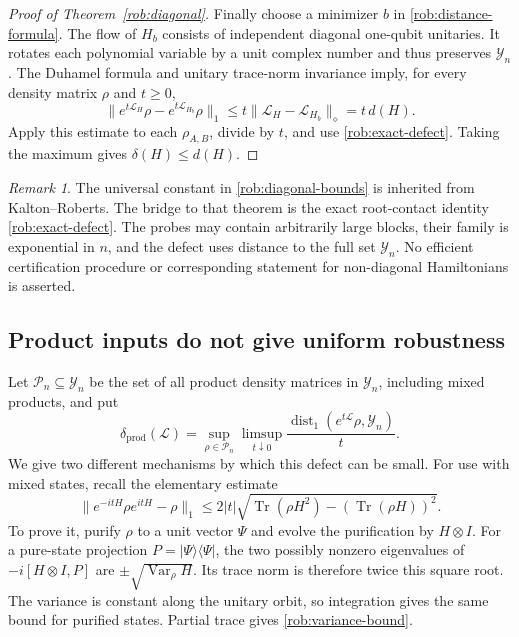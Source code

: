 \documentclass[reqno]{amsart}
\theoremstyle{definition}
\theoremstyle{remark}
\newtheorem{remark}[theorem]{Remark}
\DeclareMathOperator{\Tr}{Tr}
\begin{document}
\begin{proof}[Proof of Theorem~\ref{rob:diagonal}]
Finally choose a minimizer $b$ in \eqref{rob:distance-formula}.
The flow of $H_b$ consists of independent diagonal one-qubit
unitaries.  It rotates each polynomial variable by a unit complex
number and thus preserves $\mathcal Y_n$.
The Duhamel formula and unitary trace-norm invariance imply, for every
density matrix $\rho$ and $t\geq0$,
\[
 \|e^{t\mathcal L_H}\rho-e^{t\mathcal L_{H_b}}\rho\|_1
 \leq t\|\mathcal L_H-\mathcal L_{H_b}\|_\diamond=t\,d(H).
\]
Apply this estimate to each $\rho_{A,B}$, divide by $t$, and use
\eqref{rob:exact-defect}.  Taking the maximum gives
$\delta(H)\leq d(H)$.
\end{proof}

\begin{remark}
\label{rob:scope}
The universal constant in \eqref{rob:diagonal-bounds} is inherited
from Kalton--Roberts.  The bridge to that theorem is the exact
root-contact identity \eqref{rob:exact-defect}.
The probes may contain arbitrarily large blocks, their family is
exponential in $n$, and the defect uses distance to the full set
$\mathcal Y_n$.  No efficient certification procedure or corresponding
statement for non-diagonal Hamiltonians is asserted.
\end{remark}

\subsection{Product inputs do not give uniform robustness}

Let $\mathcal P_n\subseteq\mathcal Y_n$ be the set of all product
density matrices in $\mathcal Y_n$, including mixed products, and put
\[
 \delta_{\mathrm{prod}}(\mathcal L)
 =\sup_{\rho\in\mathcal P_n}\limsup_{t\downarrow0}
   \frac{\operatorname{dist}_1(e^{t\mathcal L}\rho,\mathcal Y_n)}{t}.
\]
We give two different mechanisms by which this defect can be small.
For use with mixed states, recall the elementary estimate
\begin{equation}
 \|e^{-itH}\rho e^{itH}-\rho\|_1
 \leq2|t|\sqrt{\Tr(\rho H^2)-(\Tr(\rho H))^2}.
 \label{rob:variance-bound}
\end{equation}
To prove it, purify $\rho$ to a unit vector $\Psi$ and evolve the
purification by $H\otimes I$.  For a pure-state projection
$P=|\Psi\rangle\langle\Psi|$, the two possibly nonzero eigenvalues
of $-i[H\otimes I,P]$ are
$\pm\sqrt{\operatorname{Var}_\rho H}$.
Its trace norm is therefore twice this square root.
The variance is constant along the unitary orbit, so integration gives
the same bound for purified states.  Partial trace gives
\eqref{rob:variance-bound}.
\end{document}
